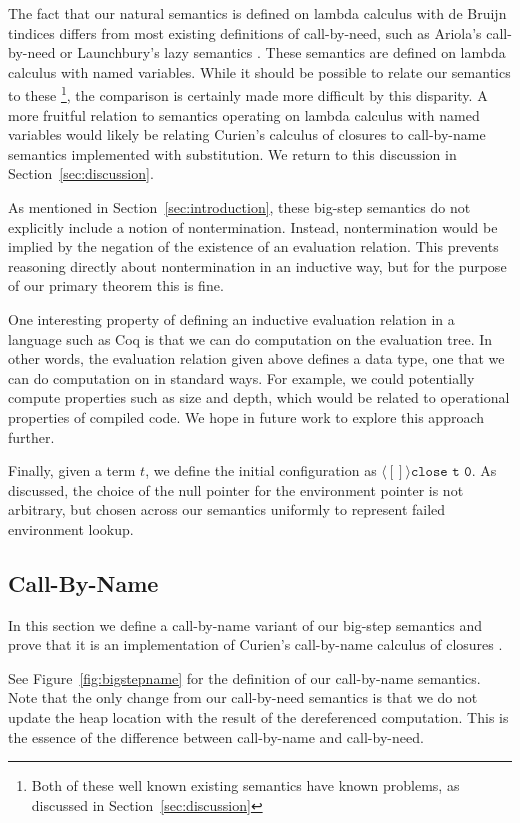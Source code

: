 The fact that our natural semantics is defined on lambda calculus with de Bruijn
tindices differs from most existing definitions of call-by-need, such as
Ariola's call-by-need \cite{ariola1995call} or Launchbury's lazy semantics
\cite{launchburynatural}. These semantics are defined on lambda calculus with named
variables. While it should be possible to relate our semantics to these
\footnote{Both of these well known existing semantics have known problems, as
discussed in Section~\ref{sec:discussion}}, the comparison is certainly made
more difficult by this disparity. A more fruitful relation to semantics
operating on lambda calculus with named variables would likely be relating
Curien's calculus of closures to call-by-name semantics implemented with
substitution. We return to this discussion in Section~\ref{sec:discussion}.

As mentioned in Section~\ref{sec:introduction}, these big-step semantics do not
explicitly include a notion of nontermination. Instead, nontermination would be
implied by the negation of the existence of an evaluation relation. This
prevents reasoning directly about nontermination in an inductive way, but for
the purpose of our primary theorem this is fine. 

One interesting property of defining an inductive evaluation relation in a
language such as Coq is that we can do computation on the evaluation tree. In other
words, the evaluation relation given above defines a data type, one that we can
do computation on in standard ways. For example, we could potentially compute
properties such as size and depth, which would be related to operational properties
of compiled code. We hope in future work to explore this approach further.

Finally, given a term $t$, we define the initial configuration as $\langle [] \rangle
\texttt{close t 0}$. As discussed, the choice of the null pointer for the environment
pointer is not arbitrary, but chosen across our semantics uniformly to represent
failed environment lookup. 

\subsection{Call-By-Name}

In this section we define a call-by-name variant of our big-step semantics and
prove that it is an implementation of Curien's call-by-name calculus of
closures \cite{curien1991abstract}. 

See Figure~\ref{fig:bigstepname} for the definition of our call-by-name
semantics. Note that the only change from our call-by-need semantics is that we
do not update the heap location with the result of the dereferenced computation.
This is the essence of the difference between call-by-name and call-by-need.

